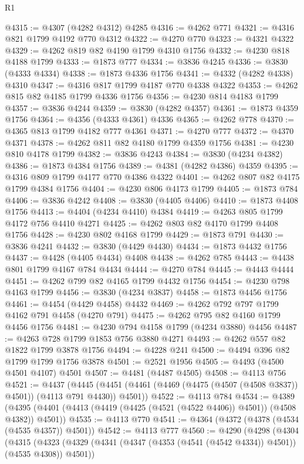 \begin{lexlean}{R1}
\begin{coremodule}
@4315 := @4307 (@4282 @4312) @4285
@4316 := @4262 @771
@4321 := @4316 @821 @1799 @4192 @770 @4312
@4322 := @4270 @770
@4323 := @4321 @4322
@4329 := @4262 @819 @82 @4190 @1799 @4310 @1756
@4332 := @4230 @818 @4188 @1799
@4333 := @1873 @777
@4334 := @3836 @4245
@4336 := @3830 (@4333 @4334)
@4338 := @1873 @4336 @1756
@4341 := @4332 (@4282 @4338) @4310
@4347 := @4316 @817 @1799 @4187 @770 @4338 @4322
@4353 := @4262 @815 @82 @4185 @1799 @4336 @1756
@4356 := @4230 @814 @4183 @1799
@4357 := @3836 @4244
@4359 := @3830 (@4282 @4357)
@4361 := @1873 @4359 @1756
@4364 := @4356 (@4333 @4361) @4336
@4365 := @4262 @778
@4370 := @4365 @813 @1799 @4182 @777 @4361
@4371 := @4270 @777
@4372 := @4370 @4371
@4378 := @4262 @811 @82 @4180 @1799 @4359 @1756
@4381 := @4230 @810 @4178 @1799
@4382 := @3836 @4243
@4384 := @3830 (@4234 @4382)
@4386 := @1873 @4384 @1756
@4389 := @4381 (@4282 @4386) @4359
@4395 := @4316 @809 @1799 @4177 @770 @4386 @4322
@4401 := @4262 @807 @82 @4175 @1799 @4384 @1756
@4404 := @4230 @806 @4173 @1799
@4405 := @1873 @784
@4406 := @3836 @4242
@4408 := @3830 (@4405 @4406)
@4410 := @1873 @4408 @1756
@4413 := @4404 (@4234 @4410) @4384
@4419 := @4263 @805 @1799 @4172 @756 @4410 @4271
@4425 := @4262 @803 @82 @4170 @1799 @4408 @1756
@4428 := @4230 @802 @4168 @1799
@4429 := @1873 @791
@4430 := @3836 @4241
@4432 := @3830 (@4429 @4430)
@4434 := @1873 @4432 @1756
@4437 := @4428 (@4405 @4434) @4408
@4438 := @4262 @785
@4443 := @4438 @801 @1799 @4167 @784 @4434
@4444 := @4270 @784
@4445 := @4443 @4444
@4451 := @4262 @799 @82 @4165 @1799 @4432 @1756
@4454 := @4230 @798 @4163 @1799
@4456 := @3830 (@4234 @3837)
@4458 := @1873 @4456 @1756
@4461 := @4454 (@4429 @4458) @4432
@4469 := @4262 @792 @797 @1799 @4162 @791 @4458 (@4270 @791)
@4475 := @4262 @795 @82 @4160 @1799 @4456 @1756
@4481 := @4230 @794 @4158 @1799 (@4234 @3880) @4456
@4487 := @4263 @728 @1799 @1853 @756 @3880 @4271
@4493 := @4262 @557 @82 @1822 @1799 @3878 @1756
@4494 := @4228 @241
@4500 := @4494 @396 @82 @1799 @1799 @1756 @3878
@4501 := @2521 @1956
@4505 := @4493 (@4500 @4501 @4107) @4501
@4507 := @4481 (@4487 @4505)
@4508 := @4113 @756
@4521 := @4437
    (@4445 (@4451 (@4461 (@4469 (@4475 (@4507 (@4508 @3837)) @4501)) (@4113 @791 @4430)) @4501))
@4522 := @4113 @784
@4534 := @4389
    (@4395 (@4401 (@4413 (@4419 (@4425 (@4521 (@4522 @4406)) @4501)) (@4508 @4382)) @4501))
@4535 := @4113 @770
@4541 := @4364 (@4372 (@4378 (@4534 (@4535 @4357)) @4501))
@4542 := @4113 @777
@4560 := @4290
    (@4298
      (@4304
        (@4315
          (@4323 (@4329 (@4341 (@4347 (@4353 (@4541 (@4542 @4334)) @4501)) (@4535 @4308)) @4501))

\end{coremodule}
\end{lexlean}
